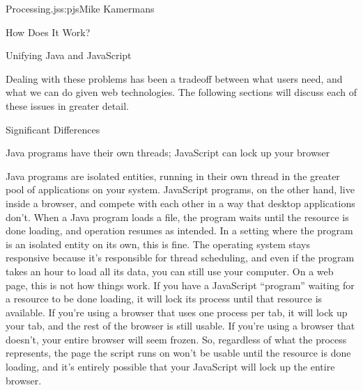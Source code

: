 \begin{aosachapter}{Processing.js}{s:pjs}{Mike Kamermans}
\begin{aosasect1}{How Does It Work?}
\begin{aosasect2}{Unifying Java and JavaScript}
\begin{aosaenumerate}
\end{aosaenumerate}

Dealing with these problems has been a tradeoff between what users
need, and what we can do given web technologies. The following
sections will discuss each of these issues in greater detail.

\end{aosasect2}

\end{aosasect1}

\begin{aosasect1}{Significant Differences}


\begin{aosasect3}{Java programs have their own threads; JavaScript can lock up your browser}

Java programs are isolated entities, running in their own thread in
the greater pool of applications on your system. JavaScript programs,
on the other hand, live inside a browser, and compete with each other
in a way that desktop applications don't. When a Java program loads a
file, the program waits until the resource is done loading, and
operation resumes as intended. In a setting where the program is an
isolated entity on its own, this is fine. The operating system stays
responsive because it's responsible for thread scheduling, and even if
the program takes an hour to load all its data, you can still use your
computer. On a web page, this is not how things work. If you have a
JavaScript ``program'' waiting for a resource to be done loading, it
will lock its process until that resource is available. If you're
using a browser that uses one process per tab, it will lock up your tab,
and the rest of the browser is still usable. If you're using a browser
that doesn't, your entire browser will seem frozen. So, regardless of
what the process represents, the page the script runs on won't be
usable until the resource is done loading, and it's entirely possible
that your JavaScript will lock up the entire browser.


\end{aosasect3}
\end{aosasect1}
\end{aosachapter}
